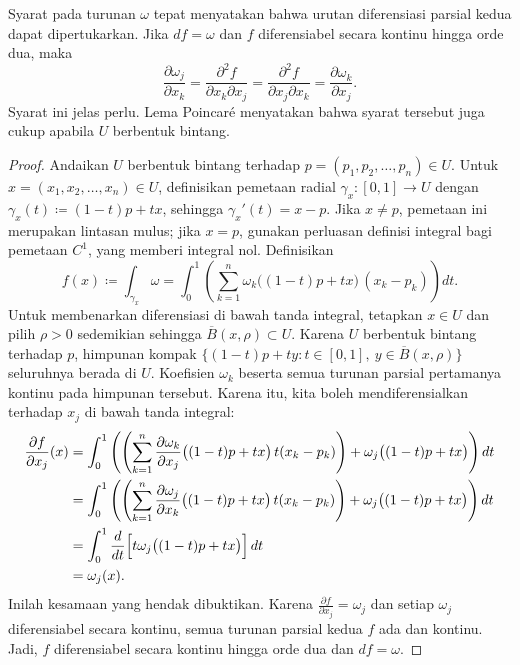 Syarat pada turunan $\omega$ tepat menyatakan bahwa urutan diferensiasi
parsial kedua dapat dipertukarkan. Jika $df = \omega$ dan $f$ diferensiabel
secara kontinu hingga orde dua, maka
\begin{equation*}
\frac{\partial \omega_j}{\partial x_k}
=
\frac{\partial^2 f}{\partial x_k \partial x_j} 
=
\frac{\partial^2 f}{\partial x_j \partial x_k} 
=
\frac{\partial \omega_k}{\partial x_j} .
\end{equation*}
Syarat ini jelas perlu. Lema Poincar\'e menyatakan bahwa syarat tersebut juga
cukup apabila $U$ berbentuk bintang.

\begin{proof}
Andaikan $U$ berbentuk bintang terhadap
$p=(p_1,p_2,\ldots,p_n) \in U$. Untuk
$x = (x_1,x_2,\ldots,x_n) \in U$, definisikan pemetaan radial
$\gamma_x \colon [0,1] \to U$ dengan
$\gamma_x(t) \coloneqq (1-t)p + tx$, sehingga $\gamma_x'(t) = x-p$. Jika
$x\neq p$, pemetaan ini merupakan lintasan mulus; jika $x=p$, gunakan
perluasan definisi integral bagi pemetaan $C^1$, yang memberi integral nol.
Definisikan
\begin{equation*}
f(x) \coloneqq \int_{\gamma_x} \omega
=
\int_0^1
\left(
\sum_{k=1}^n
\omega_k \bigl((1-t)p + tx \bigr) \, (x_k-p_k)
\right) dt .
\end{equation*}
Untuk membenarkan diferensiasi di bawah tanda integral, tetapkan
$x\in U$ dan pilih $\rho>0$ sedemikian sehingga
$\overline{B}(x,\rho)\subset U$. Karena $U$ berbentuk bintang terhadap $p$,
himpunan kompak
$\{(1-t)p+ty:t\in[0,1],\ y\in\overline{B}(x,\rho)\}$ seluruhnya berada di
$U$. Koefisien $\omega_k$ beserta semua turunan parsial pertamanya kontinu pada
himpunan tersebut. Karena itu, kita boleh mendiferensialkan terhadap $x_j$ di
bawah tanda integral:
\begin{equation*}
\begin{split}
\frac{\partial f}{\partial x_j}(x) & =
\int_0^1
\left(
\left(
\sum_{k=1}^n
\frac{\partial \omega_k}{\partial x_j} \bigl((1-t)p + tx \bigr) \, t
(x_k-p_k)
\right)
+
\omega_j \bigl((1-t)p + tx \bigr)
\right)
 dt
\\
& = 
\int_0^1
\left(
\left(
\sum_{k=1}^n
\frac{\partial \omega_j}{\partial x_k} \bigl((1-t)p + tx \bigr) \, t
(x_k-p_k)
\right)
+
\omega_j \bigl((1-t)p + tx \bigr)
\right) dt
\\
& = 
\int_0^1
\frac{d}{dt}
\Bigl[
t \omega_j\bigl((1-t)p + tx \bigr)
\Bigr]
\,
dt
\\
&= \omega_j(x) .
\end{split}
\end{equation*}
Inilah kesamaan yang hendak dibuktikan. Karena
$\frac{\partial f}{\partial x_j}=\omega_j$ dan setiap $\omega_j$ diferensiabel
secara kontinu, semua turunan parsial kedua $f$ ada dan kontinu. Jadi, $f$
diferensiabel secara kontinu hingga orde dua dan $df=\omega$.
\end{proof}

